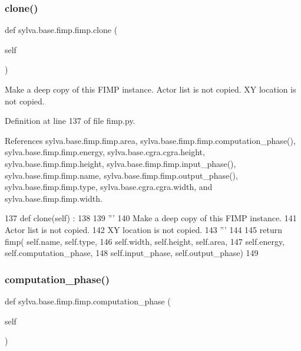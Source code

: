 \subsubsection{\texorpdfstring{clone()}{clone()}}
{\footnotesize\ttfamily def sylva.\+base.\+fimp.\+fimp.\+clone (\begin{DoxyParamCaption}\item[{}]{self }\end{DoxyParamCaption})}

\begin{DoxyVerb}  Make a deep copy of this FIMP instance.
  Actor list is not copied.
  XY location is not copied.
\end{DoxyVerb}
 

Definition at line 137 of file fimp.\+py.



References sylva.\+base.\+fimp.\+fimp.\+area, sylva.\+base.\+fimp.\+fimp.\+computation\+\_\+phase(), sylva.\+base.\+fimp.\+fimp.\+energy, sylva.\+base.\+cgra.\+cgra.\+height, sylva.\+base.\+fimp.\+fimp.\+height, sylva.\+base.\+fimp.\+fimp.\+input\+\_\+phase(), sylva.\+base.\+fimp.\+fimp.\+name, sylva.\+base.\+fimp.\+fimp.\+output\+\_\+phase(), sylva.\+base.\+fimp.\+fimp.\+type, sylva.\+base.\+cgra.\+cgra.\+width, and sylva.\+base.\+fimp.\+fimp.\+width.


\begin{DoxyCode}
137     \textcolor{keyword}{def }clone(self) :
138 
139       \textcolor{stringliteral}{'''}
140 \textcolor{stringliteral}{        Make a deep copy of this FIMP instance.}
141 \textcolor{stringliteral}{        Actor list is not copied.}
142 \textcolor{stringliteral}{        XY location is not copied.}
143 \textcolor{stringliteral}{      '''}
144 
145       \textcolor{keywordflow}{return} fimp( self.name, self.type,
146                    self.width, self.height, self.area,
147                    self.energy, self.computation\_phase,
148                    self.input\_phase, self.output\_phase)
149 
\end{DoxyCode}
\mbox{\label{classsylva_1_1base_1_1fimp_1_1fimp_abeca9fa8599aa0b8a3dea1925d8f09b2}} 
\subsubsection{\texorpdfstring{computation\+\_\+phase()}{computation\_phase()}\hspace{0.1cm}{\footnotesize\ttfamily [1/2]}}
{\footnotesize\ttfamily def sylva.\+base.\+fimp.\+fimp.\+computation\+\_\+phase (\begin{DoxyParamCaption}\item[{}]{self }\end{DoxyParamCaption})}



